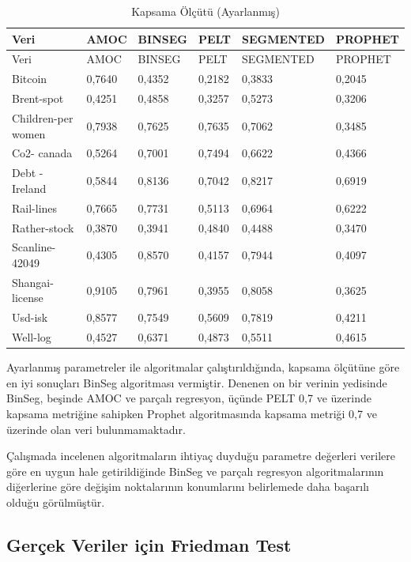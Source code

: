 \documentclass[12pt,twoside]{deuthesis}
\begin{document}
\begin{longtable}[]{@{}llllll@{}}
\caption{\label{tab:nvar5} Kapsama Ölçütü (Ayarlanmış)}\tabularnewline
\toprule\noalign{}
Veri & AMOC & BINSEG & PELT & SEGMENTED & PROPHET \\
\midrule\noalign{}
\endfirsthead
\toprule\noalign{}
Veri & AMOC & BINSEG & PELT & SEGMENTED & PROPHET \\
\midrule\noalign{}
\endhead
\bottomrule\noalign{}
\endlastfoot
Bitcoin & 0,7640 & 0,4352 & 0,2182 & 0,3833 & 0,2045 \\
Brent-spot & 0,4251 & 0,4858 & 0,3257 & 0,5273 & 0,3206 \\
Children-per women & 0,7938 & 0,7625 & 0,7635 & 0,7062 & 0,3485 \\
Co2- canada & 0,5264 & 0,7001 & 0,7494 & 0,6622 & 0,4366 \\
Debt -Ireland & 0,5844 & 0,8136 & 0,7042 & 0,8217 & 0,6919 \\
Rail-lines & 0,7665 & 0,7731 & 0,5113 & 0,6964 & 0,6222 \\
Rather-stock & 0,3870 & 0,3941 & 0,4840 & 0,4488 & 0,3470 \\
Scanline-42049 & 0,4305 & 0,8570 & 0,4157 & 0,7944 & 0,4097 \\
Shangai-license & 0,9105 & 0,7961 & 0,3955 & 0,8058 & 0,3625 \\
Usd-isk & 0,8577 & 0,7549 & 0,5609 & 0,7819 & 0,4211 \\
Well-log & 0,4527 & 0,6371 & 0,4873 & 0,5511 & 0,4615 \\
\end{longtable}

Ayarlanmış parametreler ile algoritmalar çalıştırıldığında, kapsama ölçütüne göre en iyi sonuçları BinSeg algoritması vermiştir. Denenen on bir verinin yedisinde BinSeg, beşinde AMOC ve parçalı regresyon, üçünde PELT 0,7 ve üzerinde kapsama metriğine sahipken Prophet algoritmasında kapsama metriği 0,7 ve üzerinde olan veri bulunmamaktadır.

Çalışmada incelenen algoritmaların ihtiyaç duyduğu parametre değerleri verilere göre en uygun hale getirildiğinde BinSeg ve parçalı regresyon algoritmalarının diğerlerine göre değişim noktalarının konumlarını belirlemede daha başarılı olduğu görülmüştür.

\hypertarget{geruxe7ek-veriler-iuxe7in-friedman-test}{%
\subsection{Gerçek Veriler için Friedman Test}\label{geruxe7ek-veriler-iuxe7in-friedman-test}}
\end{document}
